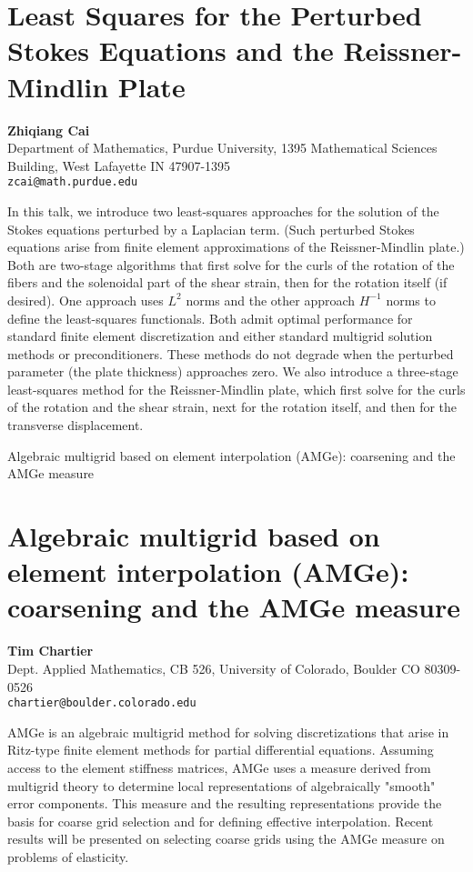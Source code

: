 \documentclass[11pt]{article}
\newcommand{\nextab}[4]{
	\section{#2}
	{\bf #1} \\ \nopagebreak
	{#3} \\ \nopagebreak
	{\tt #4} \nopagebreak
	}
\begin{document}

\nextab{Zhiqiang Cai}
	{Least Squares for the Perturbed Stokes Equations
	and the Reissner-Mindlin Plate}
	{Department of Mathematics,
		Purdue University,
		1395 Mathematical Sciences Building,
		West Lafayette IN 47907-1395}
	{zcai@math.purdue.edu}

In this talk, we introduce two least-squares approaches
for the solution of the Stokes
equations perturbed by a Laplacian term. (Such perturbed Stokes equations
arise from finite element approximations of the Reissner-Mindlin
plate.) Both are two-stage algorithms that first solve for the curls of
the rotation of the fibers and the solenoidal part of the shear strain,
then for the rotation itself (if desired). One approach uses $L^2$ norms
and the other approach $H^{-1}$ norms to define the least-squares
functionals.
Both admit optimal performance for standard finite element discretization
and either standard multigrid solution methods or preconditioners.
These methods do not degrade when the perturbed parameter (the plate
thickness) approaches zero.
We also introduce a three-stage least-squares method for the
Reissner-Mindlin plate, which first solve for the curls of the rotation
and the shear strain, next for the rotation itself, and then for the
transverse displacement.


Algebraic multigrid based on element interpolation (AMGe):
coarsening and the AMGe measure

\nextab{Tim Chartier}
	{Algebraic multigrid based on element interpolation (AMGe):
	coarsening and the AMGe measure}
	{Dept. Applied Mathematics,
		CB 526,
		University of Colorado,
		Boulder CO 80309-0526}
	{chartier@boulder.colorado.edu}

AMGe is an algebraic multigrid method for solving discretizations that
arise in Ritz-type finite
element methods for partial differential equations.  Assuming access to
the element stiffness
matrices, AMGe uses a measure derived from multigrid theory to determine
local representations
of algebraically "smooth" error components.  This measure and the
resulting representations
provide the basis for coarse grid selection and for defining effective
interpolation.
Recent results will be presented on selecting coarse grids using the
AMGe measure on problems
of elasticity.

\end{document}
